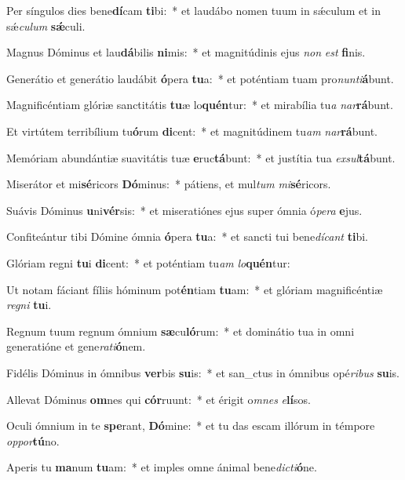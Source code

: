 \item Per síngulos dies bene\textbf{dí}cam \textbf{ti}bi:~* et laudábo nomen tuum in sǽculum et in sǽ\tinyhspace\textit{culum} \textbf{sǽ}culi.
\item Magnus Dóminus et lau\textbf{dá}bilis \textbf{ni}mis:~* et magnitúdinis ejus \textit{non} \textit{est} \textbf{fi}nis.
\item Generátio et generátio laudábit \textbf{ó}pera \textbf{tu}a:~* et poténtiam tuam pro\textit{nunti}\textbf{á}bunt.
\item Magnificéntiam glóriæ sanctitátis \textbf{tu}æ lo\textbf{quén}tur:~* et mirabília tu\tinyhspace\textit{a} \textit{nar}\textbf{rá}bunt.
\item Et virtútem terribílium tu\textbf{ó}rum \textbf{di}cent:~* et magnitúdinem tu\tinyhspace\textit{am} \textit{nar}\textbf{rá}bunt.
\item Memóriam abundántiæ suavitátis tuæ \textbf{e}ruc\textbf{tá}bunt:~* et justítia tua \textit{exsul}\textbf{tá}bunt.
\item Miserátor et mi\textbf{sé}ricors \textbf{Dó}minus:~* pátiens, et mul\textit{tum} \textit{mi}\textbf{sé}ricors.
\item Suávis Dóminus \textbf{u}ni\textbf{vér}sis:~* et miseratiónes ejus super ómnia ó\textit{pera} \textbf{e}jus.
\item Confiteántur tibi Dómine ómnia \textbf{ó}pera \textbf{tu}a:~* et san\-cti tui bene\tinyhspace\textit{dícant} \textbf{ti}bi.
\item Glóriam regni \textbf{tu}i \textbf{di}cent:~* et poténtiam tu\tinyhspace\textit{am} \textit{lo}\textbf{quén}tur:
\item Ut notam fáciant fíliis hóminum pot\textbf{én}tiam \textbf{tu}am:~* et glóriam magnificéntiæ \textit{regni} \textbf{tu}i.
\item Regnum tuum regnum ó\-mnium \textbf{sæ}cu\textbf{ló}rum:~* et dominátio tua in o\-mni generatióne et gene\textit{rati}\textbf{ó}nem.
\item Fidélis Dóminus in ómnibus \textbf{ver}bis \textbf{su}is:~* et san\_ctus in ó\-mnibus opé\textit{ribus} \textbf{su}is.
\item Allevat Dóminus \textbf{om}nes qui \textbf{cór}ruunt:~* et érigit o\textit{mnes} \textit{e}\textbf{lí}sos.
\item Oculi ó\-mnium in te \textbf{spe}rant, \textbf{Dó}mine:~* et tu das escam illórum in témpore \textit{oppor}\textbf{tú}no.
\item Aperis tu \textbf{ma}num \textbf{tu}am:~* et imples omne ánimal bene\tinyhspace\textit{dicti}\textbf{ó}ne.
